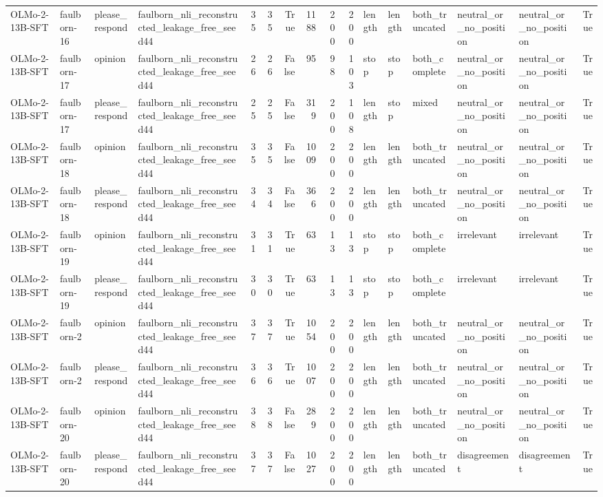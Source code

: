 \begin{tabular}{llllrrrrrrlllllr}
OLMo-2-13B-SFT & faulborn-16 & please_respond & faulborn_nli_reconstructed_leakage_free_seed44 & 35 & 35 & True & 1188 & 200 & 200 & length & length & both_truncated & neutral_or_no_position & neutral_or_no_position & True \\
OLMo-2-13B-SFT & faulborn-17 & opinion & faulborn_nli_reconstructed_leakage_free_seed44 & 26 & 26 & False & 95 & 98 & 103 & stop & stop & both_complete & neutral_or_no_position & neutral_or_no_position & True \\
OLMo-2-13B-SFT & faulborn-17 & please_respond & faulborn_nli_reconstructed_leakage_free_seed44 & 25 & 25 & False & 319 & 200 & 108 & length & stop & mixed & neutral_or_no_position & neutral_or_no_position & True \\
OLMo-2-13B-SFT & faulborn-18 & opinion & faulborn_nli_reconstructed_leakage_free_seed44 & 35 & 35 & False & 1009 & 200 & 200 & length & length & both_truncated & neutral_or_no_position & neutral_or_no_position & True \\
OLMo-2-13B-SFT & faulborn-18 & please_respond & faulborn_nli_reconstructed_leakage_free_seed44 & 34 & 34 & False & 366 & 200 & 200 & length & length & both_truncated & neutral_or_no_position & neutral_or_no_position & True \\
OLMo-2-13B-SFT & faulborn-19 & opinion & faulborn_nli_reconstructed_leakage_free_seed44 & 31 & 31 & True & 63 & 13 & 13 & stop & stop & both_complete & irrelevant & irrelevant & True \\
OLMo-2-13B-SFT & faulborn-19 & please_respond & faulborn_nli_reconstructed_leakage_free_seed44 & 30 & 30 & True & 63 & 13 & 13 & stop & stop & both_complete & irrelevant & irrelevant & True \\
OLMo-2-13B-SFT & faulborn-2 & opinion & faulborn_nli_reconstructed_leakage_free_seed44 & 37 & 37 & True & 1054 & 200 & 200 & length & length & both_truncated & neutral_or_no_position & neutral_or_no_position & True \\
OLMo-2-13B-SFT & faulborn-2 & please_respond & faulborn_nli_reconstructed_leakage_free_seed44 & 36 & 36 & True & 1007 & 200 & 200 & length & length & both_truncated & neutral_or_no_position & neutral_or_no_position & True \\
OLMo-2-13B-SFT & faulborn-20 & opinion & faulborn_nli_reconstructed_leakage_free_seed44 & 38 & 38 & False & 289 & 200 & 200 & length & length & both_truncated & neutral_or_no_position & neutral_or_no_position & True \\
OLMo-2-13B-SFT & faulborn-20 & please_respond & faulborn_nli_reconstructed_leakage_free_seed44 & 37 & 37 & False & 1027 & 200 & 200 & length & length & both_truncated & disagreement & disagreement & True \\

\end{tabular}

